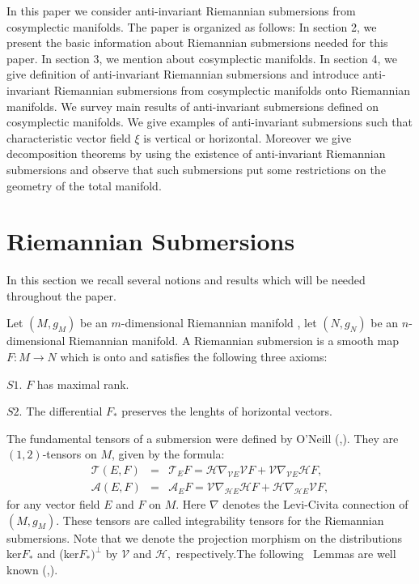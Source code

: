 \documentclass{amsart}
\theoremstyle{plain}
\numberwithin{equation}{section}
\begin{document}
In this paper we consider anti-invariant Riemannian submersions from
cosymplectic manifolds. The paper is organized as follows: In section 2, we
present the basic information about Riemannian submersions needed for this
paper. In section 3, we mention about cosymplectic manifolds. In section 4,
we give definition of anti-invariant Riemannian submersions and introduce
anti-invariant Riemannian submersions from cosymplectic manifolds onto
Riemannian manifolds. We survey main results of anti-invariant submersions
defined on cosymplectic manifolds. We give examples of anti-invariant
submersions such that characteristic vector field $\xi $ is vertical or
horizontal. Moreover we give decomposition theorems by using the existence
of anti-invariant Riemannian submersions and observe that such submersions
put some restrictions on the geometry of the total manifold.

\section{\textbf{Riemannian Submersions}}

In this section we recall several notions and results which will be needed
throughout the paper.

Let $(M,g_{M})$ be an $m$-dimensional Riemannian manifold , let $(N,g_{N})$
be an $n$-dimensional Riemannian manifold. A Riemannian submersion is a
smooth map $F:M\rightarrow N$ which is onto and satisfies the following
three axioms:

$S1$. $F$ has maximal rank.

$S2$. The differential $F_{\ast }$ preserves the lenghts of horizontal
vectors.

The fundamental tensors of a submersion were defined by O'Neill (\cite{BO1},\cite{BO2}). They are $(1,2)$-tensors on $M$, given by the formula:\begin{eqnarray}
\mathcal{T}(E,F) &=&\mathcal{T}_{E}F=\mathcal{H}\nabla _{\mathcal{V}E}\mathcal{V}F+\mathcal{V}\nabla _{\mathcal{V}E}\mathcal{H}F,  \label{AT1} \\
\mathcal{A}(E,F) &=&\mathcal{A}_{E}F=\mathcal{V}\nabla _{\mathcal{H}E}\mathcal{H}F+\mathcal{H}\nabla _{\mathcal{H}E}\mathcal{V}F,  \label{AT2}
\end{eqnarray}for any vector field $E$ and $F$ on $M.$ Here $\nabla $ denotes the
Levi-Civita connection of $(M,g_{M})$. These tensors are called
integrability tensors for the Riemannian submersions. Note that we denote
the projection morphism on the distributions ker$F_{\ast }$ and (ker$F_{\ast
})^{\perp }$ by $\mathcal{V}$ and $\mathcal{H},$ respectively.The following
\ Lemmas are well known (\cite{BO1},\cite{BO2}).
\end{document}
